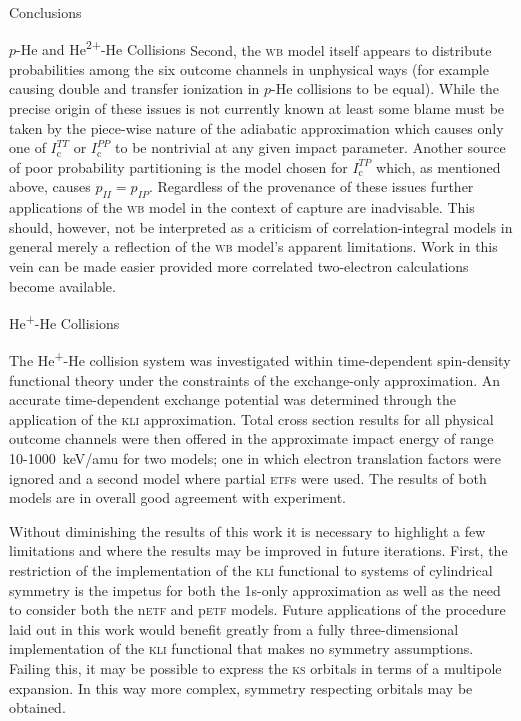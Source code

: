 \documentclass[letterpaper, 11 pt]{report}
\begin{document}
\begin{chapter}{Conclusions \label{chap:con}}
\begin{section}{\texorpdfstring{$p$}{p}-He and \texorpdfstring{He\textsuperscript{2+}}{He2+}-He
                   Collisions \label{sec:con-phe2p-he}}
      Second, the \textsc{wb} model itself appears to distribute probabilities among the six outcome
      channels in unphysical ways (for example causing double and transfer ionization in $p$-He
      collisions to be equal). While the precise origin of these issues is not currently known at least
      some blame must be taken by the piece-wise nature of the adiabatic approximation which causes only
      one of $I^{TT}_\mathrm{c}$ or $I^{PP}_\mathrm{c}$ to be nontrivial at any given impact parameter.
      Another source of poor probability partitioning is the model chosen for $I^{TP}_\mathrm{c}$ which,
      as mentioned above, causes $p_{II} = p_{IP}$. Regardless of the provenance of these issues further
      applications of the \textsc{wb} model in the context of capture are inadvisable. This should,
      however, not be interpreted as a criticism of correlation-integral models in general merely a
      reflection of the \textsc{wb} model's apparent limitations. Work in this vein can be made easier
      provided more correlated two-electron calculations become available.

   \end{section}

   \begin{section}{\texorpdfstring{He\textsuperscript{+}}{He+}-He Collisions \label{sec:con-hephe}}

      The He\textsuperscript{+}-He collision system was investigated within  time-dependent spin-density
      functional theory under the constraints of the exchange-only approximation. An accurate
      time-dependent exchange potential was determined through the application of the \textsc{kli}
      approximation. Total cross section results for all physical outcome channels were then offered in
      the approximate impact energy of range 10-1000~keV/amu for two models; one in which electron
      translation factors were ignored and a second model where partial \textsc{etf}s
      were used. The results of both models are in overall good agreement with experiment.

      Without diminishing the results of this work it is necessary to highlight a few limitations and
      where the results may be improved in future iterations. First, the restriction of the
      implementation of the \textsc{kli} functional to systems of cylindrical symmetry is the impetus
      for both the 1s-only approximation as well as the need to consider both the n\textsc{etf} and
      p\textsc{etf} models. Future applications of the procedure laid out in this work would benefit
      greatly from a fully three-dimensional implementation of the \textsc{kli} functional that makes no
      symmetry assumptions. Failing this, it may be possible to express the \textsc{ks} orbitals in
      terms of a multipole expansion. In this way more complex, symmetry respecting orbitals may be
      obtained.


\end{section}
\end{chapter}
\end{document}
